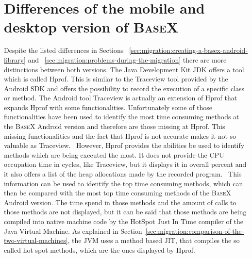 \newpage
\section{Differences of the mobile and desktop version of \textsc{BaseX}}
\label{sec:differences-of-the-two-basex-versions}
Despite the listed differences in Sections ~\ref{sec:migration:creating-a-basex-android-library} and ~\ref{sec:migration:problems-during-the-migration} there are more distinctions between both versions.
The Java Development Kit JDK offers a tool which is called Hprof.
This is similar to the Traceview tool provided by the Android SDK and offers the possibility to record the execution of a specific class or method.
The Android tool Traceview is actually an extension of Hprof that expands Hprof with some functionalities.
Unfortunately some of those functionalities have been used to identify the most time consuming methods at the \textsc{BaseX} Android version and therefore are those missing at Hprof.
This missing functionalities and the fact that Hprof is not accurate makes it not so valuable as Traceview.~\cite{mytkowicz2010evaluating}
However, Hprof provides the abilities be used to identify methods which are being executed the most.
It does not provide the CPU occupation time in cycles, like Traceview, but it displays it in overall percent and it also offers a list of the heap allocations made by the recorded program.~\cite{liang1999comprehensive}
This information can be used to identify the top time consuming methods, which can then be compared with the most top time consuming methods of the \textsc{BaseX} Android version.
The time spend in those methods and the amount of calls to those methods are not displayed, but it can be said that those methods are being compiled into native machine code by the HotSpot Just In Time compiler of the Java Virtual Machine.
As explained in Section~\ref{sec:migration:comparison-of-the-two-virtual-machines}, the JVM uses a method based JIT, that compiles the so called hot spot methods, which are the ones displayed by Hprof. 


